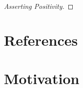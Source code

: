 \documentclass[preprint,leqno]{elsarticle}
\begin{document}

\begin{proof}[Asserting Positivity]

\end{proof}

\section*{References}





\section{Motivation}
\end{document}
